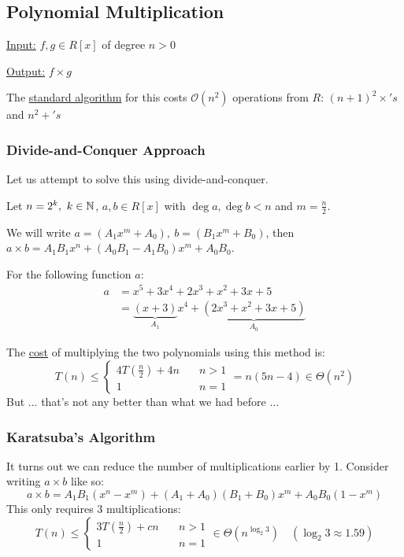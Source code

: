 \subsection{Polynomial Multiplication}
\underline{Input:} $f,g \in R[x]$ of degree $n > 0$

\underline{Output:} $f \times g$

The \underline{standard algorithm} for this costs $\mathcal{O}(n^2)$ operations from $R$: $(n + 1)^2 \times's$ and $n^2 +'s$

\subsubsection{Divide-and-Conquer Approach}
Let us attempt to solve this using divide-and-conquer.

Let $n = 2^k, \ k \in \mathbb{N}$, $a,b \in R[x]$ with $\deg a, \deg b < n$ and $m = \frac{n}{2}$.

We will write $a = (A_1x^m + A_0), \ b = (B_1x^m + B_0)$, then $a \times b = A_1B_1x^n + (A_0B_1 - A_1B_0)x^m + A_0B_0$.

\begin{example}
    For the following function $a$:
    \begin{align*}
        a &= x^5 + 3x^4 + 2x^3 + x^2 + 3x + 5 \\
        &= \underbrace{(x+3)}_{A_1}x^4 + 
        \underbrace{(2x^3 + x^2 + 3x + 5)}_{A_0}
    \end{align*}
\end{example}

The \underline{cost} of multiplying the two polynomials using this method is:
\begin{equation*}
    T(n) \leq
    \begin{cases}
        4T\left(\frac{n}{2}\right) + 4n \quad & n > 1 \\
        1 \quad & n = 1
    \end{cases}
    = n(5n - 4) \in \Theta(n^2)
\end{equation*}
But ... that's not any better than what we had before ...

\subsubsection{Karatsuba's Algorithm}
It turns out we can reduce the number of multiplications earlier by 1.
Consider writing $a \times b$ like so:
\begin{equation*}
    a \times b = A_1B_1(x^n - x^m) + (A_1 + A_0)(B_1 + B_0)x^m + A_0B_0(1 - x^m)
\end{equation*}
This only requires $3$ multiplications:
\begin{equation*}
    T(n) \leq
    \begin{cases}
        3T\left(\frac{n}{2}\right) + cn \quad & n > 1 \\
        1 \quad & n = 1
    \end{cases}
    \in \Theta(n^{\log_2 3}) \quad (\log_2 3 \approx 1.59)
\end{equation*}

